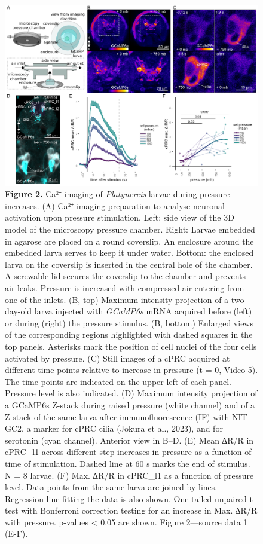 \documentclass[
  11pt,
]{article}
\begin{document}
\begin{figure}[H]

{\centering \includegraphics[width=1\textwidth,height=\textheight]{Figures/Figure2.png}

}

\caption{\textbf{Figure 2.} Ca²⁺ imaging of \emph{Platynereis} larvae
during pressure increases. (A) Ca²⁺ imaging preparation to analyse
neuronal activation upon pressure stimulation. Left: side view of the 3D
model of the microscopy pressure chamber. Right: Larvae embedded in
agarose are placed on a round coverslip. An enclosure around the
embedded larva serves to keep it under water. Bottom: the enclosed larva
on the coverslip is inserted in the central hole of the chamber. A
screwable lid secures the coverslip to the chamber and prevents air
leaks. Pressure is increased with compressed air entering from one of
the inlets. (B, top) Maximum intensity projection of a two-day-old larva
injected with \emph{GCaMP6s} mRNA acquired before (left) or during
(right) the pressure stimulus. (B, bottom) Enlarged views of the
corresponding regions highlighted with dashed squares in the top panels.
Asterisks mark the position of cell nuclei of the four cells activated
by pressure. (C) Still images of a cPRC acquired at different time
points relative to increase in pressure (t = 0, Video 5). The time
points are indicated on the upper left of each panel. Pressure level is
also indicated. (D) Maximum intensity projection of a GCaMP6s Z-stack
during raised pressure (white channel) and of a Z-stack of the same
larva after immunofluorescence (IF) with NIT-GC2, a marker for cPRC
cilia (Jokura et al., 2023), and for serotonin (cyan channel). Anterior
view in B--D. (E) Mean ∆R/R in cPRC\_l1 across different step increases
in pressure as a function of time of stimulation. Dashed line at 60 s
marks the end of stimulus. N = 8 larvae. (F) Max. ∆R/R in cPRC\_l1 as a
function of pressure level. Data points from the same larva are joined
by lines. Regression line fitting the data is also shown. One-tailed
unpaired t-test with Bonferroni correction testing for an increase in
Max. ∆R/R with pressure. p-values \textless{} 0.05 are shown. Figure
2---source data 1 (E-F).}

\end{figure}%
\end{document}

